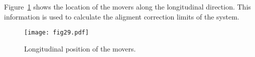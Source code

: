 Figure~\ref{f:moverlong} shows the location of the movers along the longitudinal direction. This information is used to calculate the aligment correction limits of the system.\par
\begin{figure}[h]
\centering
\texttt{[image: fig29.pdf]}\caption{Longitudinal position of the movers.}\label{f:moverlong}
\end{figure}
